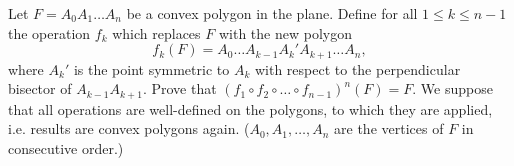 \documentclass{article}
\begin{document}
\setlength{\parindent}{0pt}
Let $F=A_{0}A_{1}\dots A_{n}$ be a convex polygon in the plane. Define for all $1\le k\le n-1$ the operation $f_{k}$ which replaces $F$ with the new polygon$$f_{k}(F)=A_{0}\dots A_{k-1}A_{k}'A_{k+1}\dots A_{n},$$where $A_{k}'$ is the point symmetric to $A_{k}$ with respect to the perpendicular bisector of $A_{k-1}A_{k+1}$. Prove that $(f_{1}\circ f_{2}\circ\dots\circ f_{n-1})^{n}(F)=F$. We suppose that all operations are well-defined on the polygons, to which they are applied, i.e. results are convex polygons again. ($A_{0},A_{1},\dots,A_{n}$ are the vertices of $F$ in consecutive order.)
\end{document}
